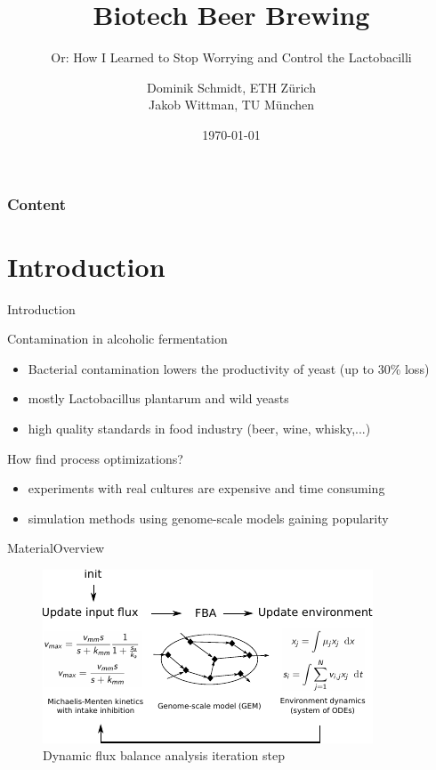 \documentclass{beamer}
\title{Biotech Beer Brewing}
\subtitle{Or: How I Learned to Stop Worrying and Control the Lactobacilli}
\author{Dominik Schmidt, ETH Zürich\\Jakob Wittman, TU München}
\institute{Háskóli Íslands}
\date{\today}
\begin{document}
\begin{frame}[plain]
	\titlepage
\end{frame}
\begin{frame}
  \frametitle{Content}
  \tableofcontents
\end{frame}

\section{Introduction}
\begin{frame}{Introduction}
  \begin{block}{Contamination in alcoholic fermentation}
    \begin{itemize}
      \item Bacterial contamination lowers the productivity of yeast (up to 30\% loss)
      \item mostly Lactobacillus plantarum and wild yeasts
      \item high quality standards in food industry (beer, wine, whisky,...)
    \end{itemize}
  \end{block}

  \begin{block}{How find process optimizations?}
    \begin{itemize}
     \item experiments with real cultures are expensive and time consuming
     \item simulation methods using genome-scale models gaining popularity
    \end{itemize}
  \end{block}
\end{frame}

\begin{frame}{Material}{Overview}

\begin{figure}[!h]
\includegraphics[width=\linewidth]{Img/dfba.pdf}
\caption{Dynamic flux balance analysis iteration step}
\label{fig:dfba}
\end{figure}
\end{frame}
\end{document}
